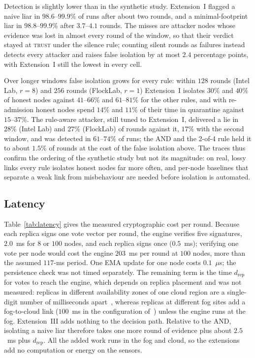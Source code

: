 \documentclass[lineno,pdflatex,sn-nature]{sn-jnl}
\theoremstyle{thmstyleone}%
\theoremstyle{thmstylethree}%
\begin{document}
Detection is slightly lower than in the synthetic study.  Extension~I
flagged a naive liar in $98.6$--$99.9\%$ of runs after about two rounds,
and a minimal-footprint liar in $98.8$--$99.9\%$ after $3.7$--$4.1$
rounds.  The misses are attacker nodes whose evidence was lost in
almost every round of the window, so that their verdict stayed at
\textsc{trust} under the silence rule; counting silent rounds as
failures instead detects every attacker and raises false isolation by
at most $2.4$ percentage points, with Extension~I still the lowest in
every cell.

Over longer windows false isolation grows for every rule: within $128$
rounds (Intel Lab, $r=8$) and $256$ rounds (FlockLab, $r=1$) Extension~I
isolates $30\%$ and $40\%$ of honest nodes against $41$--$66\%$ and
$61$--$81\%$ for the other rules, and with re-admission honest nodes
spend $14\%$ and $11\%$ of their time in quarantine against
$15$--$37\%$.  The rule-aware attacker, still tuned to Extension~I,
delivered a lie in $28\%$ (Intel Lab) and $27\%$ (FlockLab) of rounds
against it, $17\%$ with the second window, and was detected in
$61$--$74\%$ of runs; the AND and the 2-of-4 rule held it to about
$1.5\%$ of rounds at the cost of the false isolation above.  The
traces thus confirm the ordering of the synthetic study but not its
magnitude: on real, lossy links every rule isolates honest nodes far
more often, and per-node baselines that separate a weak link from
misbehaviour are needed before isolation is automated.

\subsection{Latency}
\label{sec:res-latency}
Table~\ref{tab:latency} gives the measured cryptographic cost per round.
Because each replica signs one vote vector per round, the engine
verifies five signatures, $2.0$~ms for $8$ or $100$ nodes, and each
replica signs once ($0.5$~ms); verifying one vote per node would cost the
engine $203$~ms per round at $100$ nodes, more than the assumed
$117$-ms period.  One EMA update for one node costs
$0.1$~$\mu$s; the persistence check was not timed separately.  The remaining term is the time
$d_{\mathrm{rep}}$ for votes to reach the engine, which depends on
replica placement and was not measured: replicas in different
availability zones of one cloud region are a single-digit number of
milliseconds apart~\cite{aws2024az}, whereas replicas at different fog
sites add a fog-to-cloud link ($100$~ms in the configuration
of~\cite{soula2024iodt}) unless the engine runs at the fog.
Extension~III adds nothing to the decision path.  Relative to the AND,
isolating a naive liar therefore takes one more round of evidence plus
about $2.5$~ms plus $d_{\mathrm{rep}}$.  All the added work runs in the
fog and cloud, so the extensions add no computation or energy on the
sensors.
\end{document}
